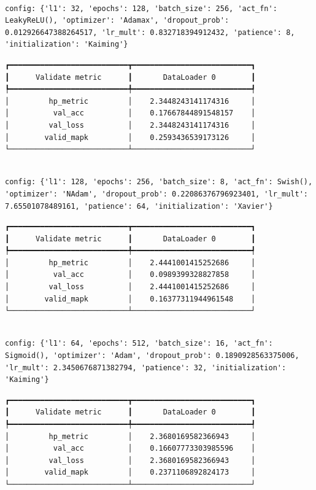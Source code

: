 \documentclass[
  letterpaper,
  DIV=11,
  numbers=noendperiod]{scrreprt}
\begin{document}
\begin{verbatim}

config: {'l1': 32, 'epochs': 128, 'batch_size': 256, 'act_fn': LeakyReLU(), 'optimizer': 'Adamax', 'dropout_prob': 0.012926647388264517, 'lr_mult': 0.832718394912432, 'patience': 8, 'initialization': 'Kaiming'}
\end{verbatim}

\begin{verbatim}
┏━━━━━━━━━━━━━━━━━━━━━━━━━━━┳━━━━━━━━━━━━━━━━━━━━━━━━━━━┓
┃      Validate metric      ┃       DataLoader 0        ┃
┡━━━━━━━━━━━━━━━━━━━━━━━━━━━╇━━━━━━━━━━━━━━━━━━━━━━━━━━━┩
│         hp_metric         │    2.3448243141174316     │
│          val_acc          │    0.17667844891548157    │
│         val_loss          │    2.3448243141174316     │
│        valid_mapk         │    0.2593436539173126     │
└───────────────────────────┴───────────────────────────┘
\end{verbatim}

\begin{verbatim}

config: {'l1': 128, 'epochs': 256, 'batch_size': 8, 'act_fn': Swish(), 'optimizer': 'NAdam', 'dropout_prob': 0.22086376796923401, 'lr_mult': 7.65501078489161, 'patience': 64, 'initialization': 'Xavier'}
\end{verbatim}

\begin{verbatim}
┏━━━━━━━━━━━━━━━━━━━━━━━━━━━┳━━━━━━━━━━━━━━━━━━━━━━━━━━━┓
┃      Validate metric      ┃       DataLoader 0        ┃
┡━━━━━━━━━━━━━━━━━━━━━━━━━━━╇━━━━━━━━━━━━━━━━━━━━━━━━━━━┩
│         hp_metric         │    2.4441001415252686     │
│          val_acc          │    0.0989399328827858     │
│         val_loss          │    2.4441001415252686     │
│        valid_mapk         │    0.16377311944961548    │
└───────────────────────────┴───────────────────────────┘
\end{verbatim}

\begin{verbatim}

config: {'l1': 64, 'epochs': 512, 'batch_size': 16, 'act_fn': Sigmoid(), 'optimizer': 'Adam', 'dropout_prob': 0.1890928563375006, 'lr_mult': 2.3450676871382794, 'patience': 32, 'initialization': 'Kaiming'}
\end{verbatim}

\begin{verbatim}
┏━━━━━━━━━━━━━━━━━━━━━━━━━━━┳━━━━━━━━━━━━━━━━━━━━━━━━━━━┓
┃      Validate metric      ┃       DataLoader 0        ┃
┡━━━━━━━━━━━━━━━━━━━━━━━━━━━╇━━━━━━━━━━━━━━━━━━━━━━━━━━━┩
│         hp_metric         │    2.3680169582366943     │
│          val_acc          │    0.16607773303985596    │
│         val_loss          │    2.3680169582366943     │
│        valid_mapk         │    0.2371106892824173     │
└───────────────────────────┴───────────────────────────┘
\end{verbatim}
\end{document}
